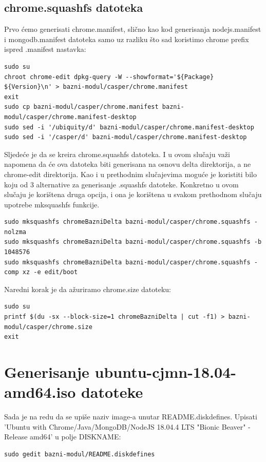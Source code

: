 \documentclass[12pt,vi]{mitthesis}
\begin{document}
\subsection*{chrome.squashfs datoteka}
\indent
Prvo ćemo generisati chrome.manifest, slično kao kod generisanja nodejs.manifest i mongodb.manifest datoteka samo uz razliku što sad koristimo chrome prefix ispred .manifest nastavka:
\begin{lstlisting}[style=BashInputStyle]
sudo su
chroot chrome-edit dpkg-query -W --showformat='${Package} ${Version}\n' > bazni-modul/casper/chrome.manifest
exit
sudo cp bazni-modul/casper/chrome.manifest bazni-modul/casper/chrome.manifest-desktop
sudo sed -i '/ubiquity/d' bazni-modul/casper/chrome.manifest-desktop
sudo sed -i '/casper/d' bazni-modul/casper/chrome.manifest-desktop
\end{lstlisting}
\indent
Sljedeće je da se kreira chrome.squashfs datoteka. I u ovom slučaju važi napomena da će ova datoteka biti generisana na osnovu delta direktorija, a ne chrome-edit direktorija. Kao i u prethodnim slučajevima moguće je koristiti bilo koju od 3 alternative za generisanje .squashfs datoteke. Konkretno u ovom slučaju je korištena druga opcija, i ona je korištena u svakom prethodnom slučaju upotrebe mksquashfs funkcije.
\begin{lstlisting}[style=BashInputStyle]
sudo mksquashfs chromeBazniDelta bazni-modul/casper/chrome.squashfs -nolzma 
sudo mksquashfs chromeBazniDelta bazni-modul/casper/chrome.squashfs -b 1048576
sudo mksquashfs chromeBazniDelta bazni-modul/casper/chrome.squashfs -comp xz -e edit/boot
\end{lstlisting}

\noindent
Naredni korak je da ažuriramo chrome.size datoteku:
\begin{lstlisting}[style=BashInputStyle]
sudo su
printf $(du -sx --block-size=1 chromeBazniDelta | cut -f1) > bazni-modul/casper/chrome.size
exit
\end{lstlisting}

\section*{Generisanje ubuntu-cjmn-18.04-amd64.iso datoteke}
\indent
Sada je na redu da se upiše naziv image-a unutar README.diskdefines. 
Upisati 'Ubuntu with Chrome/Java/MongoDB/NodeJS 18.04.4 LTS "Bionic Beaver" - Release amd64' u polje DISKNAME:
\begin{lstlisting}[style=BashInputStyle]
sudo gedit bazni-modul/README.diskdefines
\end{lstlisting}
\end{document}
